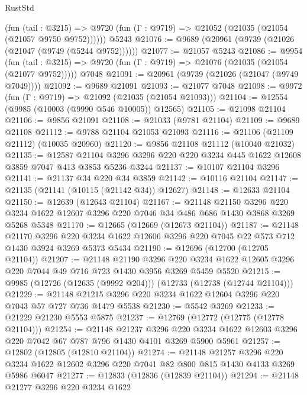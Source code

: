 \begin{lexlean}{RustStd}
\begin{coremodule}
      (fun (tail : @3215) =>
      @9720 (fun (Γ : @9719) => @21052 (@21035 (@21054 (@21057 @9750 @9752))))))
    @5243
@21076 := @9689 (@20961 (@9739 (@21026 (@21047 (@9749 (@5244 @9752))))))
@21077 := @21057 @5243
@21086 := @9954
    (fun (tail : @3215) => @9720 (fun (Γ : @9719) => @21076 (@21035 (@21054 (@21077 @9752)))))
    @7048
@21091 := @20961 (@9739 (@21026 (@21047 (@9749 @7049))))
@21092 := @9689 @21091
@21093 := @21077 @7048
@21098 := @9972 (fun (Γ : @9719) => @21092 (@21035 (@21054 @21093)))
@21104 := @12554 (@9985 (@10003 (@9990 @546 @10005)) @12565)
@21105 := @21098 @21104
@21106 := @9856 @21091
@21108 := @21033 (@9781 @21104)
@21109 := @9689 @21108
@21112 := @9788 @21104 @21053 @21093
@21116 := @21106 (@21109 @21112) (@10035 @20960)
@21120 := @9856 @21108 @21112 (@10040 @21032)
@21135 := @12587
    @21104
    @3296
    @3296
    @220
    @220
    @3234
    @445
    @1622
    @12608
    @3859
    @7047
    @413
    @3853
    @5236
    @3244
@21137 := @10107 @21104 @3296
@21141 := @21137 @34 @220 @34 @3859
@21142 := @10116 @21104
@21147 := @21135 (@21141 (@10115 (@21142 @34)) @12627)
@21148 := @12633 @21104
@21150 := @12639 (@12643 @21104)
@21167 := @21148
    @21150
    @3296
    @220
    @3234
    @1622
    @12607
    @3296
    @220
    @7046
    @34
    @486
    @686
    @1430
    @3868
    @3269
    @5268
    @5348
@21170 := @12665 (@12669 (@12673 @21104))
@21187 := @21148
    @21170
    @3296
    @220
    @3234
    @1622
    @12606
    @3296
    @220
    @7045
    @22
    @573
    @712
    @1430
    @3924
    @3269
    @5373
    @5434
@21190 := @12696 (@12700 (@12705 @21104))
@21207 := @21148
    @21190
    @3296
    @220
    @3234
    @1622
    @12605
    @3296
    @220
    @7044
    @49
    @716
    @723
    @1430
    @3956
    @3269
    @5459
    @5520
@21215 := @9985 (@12726 (@12635 (@9992 @204))) (@12733 (@12738 (@12744 @21104)))
@21229 := @21148 @21215 @3296 @220 @3234 @1622 @12604 @3296 @220 @7043 @57 @727 @736 @1479 @5538
@21230 := @5542 @3269
@21233 := @21229 @21230 @5553 @5875
@21237 := @12769 (@12772 (@12775 (@12778 @21104)))
@21254 := @21148
    @21237
    @3296
    @220
    @3234
    @1622
    @12603
    @3296
    @220
    @7042
    @67
    @787
    @796
    @1430
    @4101
    @3269
    @5900
    @5961
@21257 := @12802 (@12805 (@12810 @21104))
@21274 := @21148
    @21257
    @3296
    @220
    @3234
    @1622
    @12602
    @3296
    @220
    @7041
    @82
    @800
    @815
    @1430
    @4133
    @3269
    @5986
    @6047
@21277 := @12833 (@12836 (@12839 @21104))
@21294 := @21148
    @21277
    @3296
    @220
    @3234
    @1622

\end{coremodule}
\end{lexlean}

